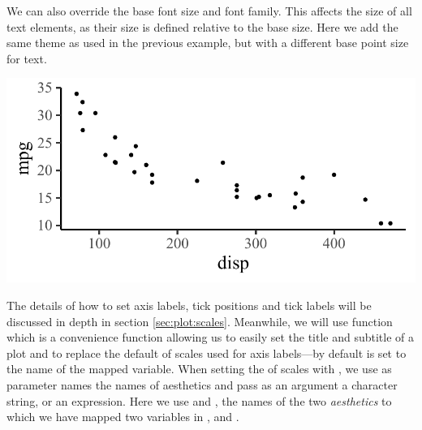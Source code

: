 \documentclass[krantz2]{krantz}\usepackage{knitr}
\begin{document}
We can also override the base font size and font family. This affects the size of all text elements, as their size is defined relative to the base size. Here we add the same theme as used in the previous example, but with a different base point size for text.

\begin{knitrout}\footnotesize
{}\color{fgcolor}\begin{kframe}
\begin{alltt}
\hlstd{(} 
       \hlstd{(}    \hlopt{+}
  \hlstd{()} \hlopt{+}
  \hlstd{(} \hlstd{=} \hlstd{,}  \hlstd{=} \hlstd{)}
\end{alltt}
\end{kframe}

{\centering \includegraphics[width=.7\textwidth]{figure/pos-ggplot-basics-10-1} 

}


\end{knitrout}

The details of how to set axis labels, tick positions and tick labels will be discussed in depth in section \ref{sec:plot:scales}. Meanwhile, we will use function  which is a convenience function allowing us to easily set the title and subtitle of a plot and to replace the default  of scales used for axis labels---by default  is set to the name of the mapped variable. When setting the  of scales with , we use as parameter names the names of aesthetics and pass as an argument a character string, or an \Rlang expression. Here we use  and , the names of the two \emph{aesthetics} to which we have mapped two variables in ,  and .
\end{document}
